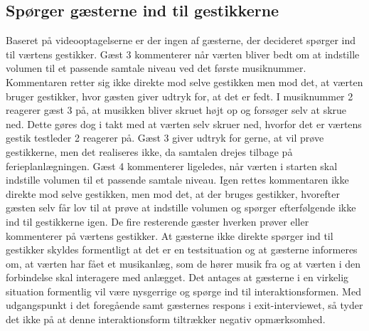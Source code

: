 \subsection{Spørger gæsterne ind til gestikkerne}
\label{TestresultaterSocialAcceptGaestSPGGestikker}
%
Baseret på videooptagelserne er der ingen af gæsterne, der decideret spørger ind til værtens gestikker. Gæst 3 kommenterer når værten bliver bedt om at indstille volumen til et passende samtale niveau ved det første musiknummer. Kommentaren retter sig ikke direkte mod selve gestikken men mod det, at værten bruger gestikker, hvor gæsten giver udtryk for, at det er fedt. I musiknummer 2 reagerer gæst 3 på, at musikken bliver skruet højt op og forsøger selv at skrue ned. Dette gøres dog i takt med at værten selv skruer ned, hvorfor det er værtens gestik testleder 2 reagerer på. Gæst 3 giver udtryk for gerne, at vil prøve gestikkerne, men det realiseres ikke, da samtalen drejes tilbage på ferieplanlægningen. Gæst 4 kommenterer ligeledes, når værten i starten skal indstille volumen til et passende samtale niveau. Igen rettes kommentaren ikke direkte mod selve gestikken, men mod det, at der bruges gestikker, hvorefter gæsten selv får lov til at prøve at indstille volumen og spørger efterfølgende ikke ind til gestikkerne igen. De fire resterende gæster hverken prøver eller kommenterer på værtens gestikker. At gæsterne ikke direkte spørger ind til gestikker skyldes formentligt at det er en testsituation og at gæsterne informeres om, at værten har fået et musikanlæg, som de hører musik fra og at værten i den forbindelse skal interagere med anlægget. Det antages at gæsterne i en virkelig situation formentlig vil være nysgerrige og spørge ind til interaktionsformen. Med udgangspunkt i det foregående samt gæsternes respons i exit-interviewet, så tyder det ikke på at denne interaktionsform tiltrækker negativ opmærksomhed. 
%
